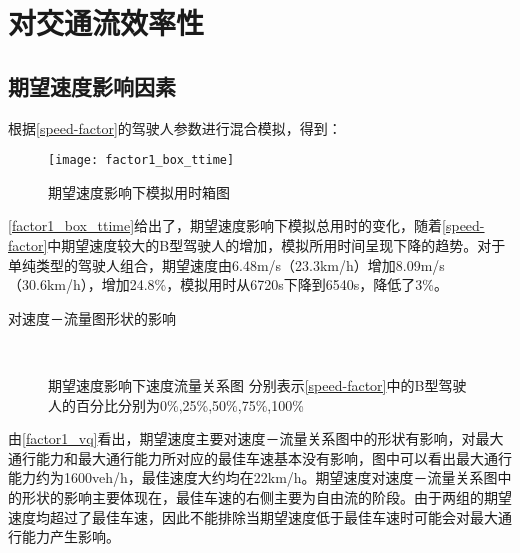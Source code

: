 \section{对交通流效率性}

\subsection{期望速度影响因素}
根据\autoref{speed-factor}的驾驶人参数进行混合模拟，得到：

\begin{figure}[!htb]
\begin{center}
\texttt{[image: factor1\_box\_ttime]}
\caption{期望速度影响下模拟用时箱图}
\label{factor1_box_ttime}
\end{center}
\end{figure}

\autoref{factor1_box_ttime}给出了，期望速度影响下模拟总用时的变化，随着\autoref{speed-factor}中期望速度较大的B型驾驶人的增加，模拟所用时间呈现下降的趋势。对于单纯类型的驾驶人组合，期望速度由6.48m/s（23.3km/h）增加8.09m/s（30.6km/h），增加24.8\%，模拟用时从6720s下降到6540s，降低了3\%。

对速度－流量图形状的影响


\begin{figure}[!htb]%
\centering
{}%
\\%
%
\caption[A set of four sub-floats.]{期望速度影响下速度流量关系图
分别表示\autoref{speed-factor}中的B型驾驶人的百分比分别为0\%,25\%,50\%,75\%,100\%}%
\label{factor1_vq}%
\end{figure}

由\autoref{factor1_vq}看出，期望速度主要对速度－流量关系图中的形状有影响，对最大通行能力和最大通行能力所对应的最佳车速基本没有影响，图中可以看出最大通行能力约为1600veh/h，最佳速度大约均在22km/h。期望速度对速度－流量关系图中的形状的影响主要体现在，最佳车速的右侧主要为自由流的阶段。由于两组的期望速度均超过了最佳车速，因此不能排除当期望速度低于最佳车速时可能会对最大通行能力产生影响。



